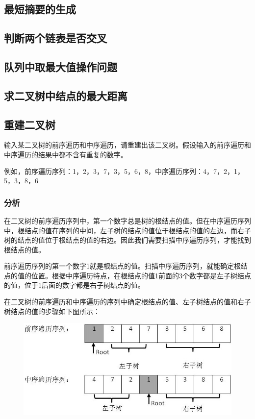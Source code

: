 \documentclass[UTF8,a4paper,12pt]{ctexbook}
\begin{document}
		\subsection{最短摘要的生成}
		
		\subsection{判断两个链表是否交叉}
		
		\subsection{队列中取最大值操作问题}
		
		\subsection{求二叉树中结点的最大距离}
		
		\subsection{重建二叉树}
				输入某二叉树的前序遍历和中序遍历，请重建出该二叉树。假设输入的前序遍历和中序遍历的结果中都不含有重复的数字。
				
				例如，前序遍历序列：1，2，3，7，3，5，6，8，中序遍历序列：4，7，2，1，5，3，8，6
			\subsubsection{分析}
				在二叉树的前序遍历序列中，第一个数字总是树的根结点的值。但在中序遍历序列中，根结点的值在序列的中间，左子树的结点的值位于根结点的值的左边，而右子树的结点的值位于根结点的值的右边。因此我们需要扫描中序遍历序列，才能找到根结点的值。
				
				前序遍历序列的第一个数字1就是根结点的值。扫描中序遍历序列，就能确定根结点的值的位置。根据中序遍历特点，在根结点的值1前面的3个数字都是左子树结点的值，位于1后面的数字都是右子树结点的值。
	
				在二叉树的前序遍历和中序遍历的序列中确定根结点的值、左子树结点的值和右子树结点的值的步骤如下图所示：
				
				\begin{figure}[h]
					\centering
					\includegraphics[scale = 0.7]{preOrderTree.jpg}
				\end{figure}
				
\end{document}

